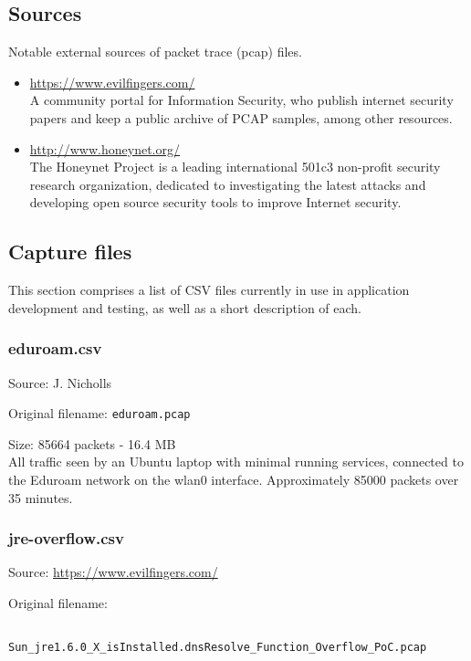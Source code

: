 \documentclass[12pt,a4paper]{article}
\newcommand{\dbl}{\\[\baselineskip]}
\begin{document}
	\subsection*{Sources}
	
	Notable external sources of packet trace (pcap) files.
	
	\begin{itemize}
		\item \url{https://www.evilfingers.com/} \\
		A community portal for Information Security, who publish
		internet security papers and keep a public archive of
		PCAP samples, among other resources.
		
		\item \url{http://www.honeynet.org/} \\
		The Honeynet Project is a leading international 501c3
		non-profit security research organization, dedicated to
		investigating the latest attacks and developing open source
		security tools to improve Internet security.
	\end{itemize}
	
	\pagebreak
	
	\subsection*{Capture files}
	This section comprises a list of CSV files currently in use in
	application development and testing, as well as a short
	description of each.
	
	\subsubsection*{eduroam.csv}
	Source: J. Nicholls
	
	Original filename: \verb!eduroam.pcap!
	
	Size: 85664 packets - 16.4 MB \dbl
	All traffic seen by an Ubuntu laptop with minimal running
	services, connected to the Eduroam network on the wlan0
	interface. Approximately 85000 packets over 35 minutes.
	
	\subsubsection*{jre-overflow.csv}
	Source: \url{https://www.evilfingers.com/}
	
	Original filename:
	
	\verb!        Sun_jre1.6.0_X_isInstalled.dnsResolve_Function_Overflow_PoC.pcap!
	
\end{document}
